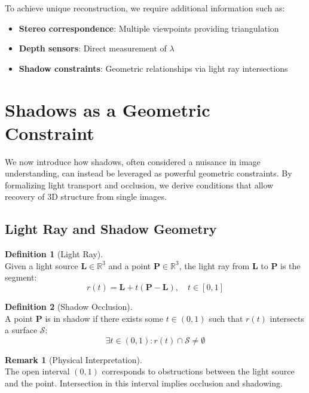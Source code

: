 \documentclass[12pt]{article}
\newcommand{\vect}[1]{\bm{#1}}
\theoremstyle{definition}
\newtheorem{definition}{Definition}[section]
\newtheorem{remark}{Remark}[section]
\begin{document}
To achieve unique reconstruction, we require additional information such as:
\begin{itemize}
    \item \textbf{Stereo correspondence}: Multiple viewpoints providing triangulation
    \item \textbf{Depth sensors}: Direct measurement of $\lambda$
    \item \textbf{Shadow constraints}: Geometric relationships via light ray intersections
\end{itemize}

\section{Shadows as a Geometric Constraint}

We now introduce how shadows, often considered a nuisance in image understanding, can instead be leveraged as powerful geometric constraints. By formalizing light transport and occlusion, we derive conditions that allow recovery of 3D structure from single images.

\subsection{Light Ray and Shadow Geometry}

\begin{definition}[Light Ray] ~\\
Given a light source $\vect{L} \in \mathbb{R}^3$ and a point $\vect{P} \in \mathbb{R}^3$, the light ray from $\vect{L}$ to $\vect{P}$ is the segment:
\begin{equation}
\boxed{r(t) = \vect{L} + t(\vect{P} - \vect{L}), \quad t \in [0,1]} \label{eq:light_ray}
\end{equation}
\end{definition}

\begin{definition}[Shadow Occlusion] ~\\
A point $\vect{P}$ is in shadow if there exists some $t \in (0,1)$ such that $r(t)$ intersects a surface $\mathcal{S}$:
\begin{equation}
\boxed{\exists t \in (0,1): r(t) \cap \mathcal{S} \neq \emptyset}
\end{equation}
\end{definition}

\begin{remark}[Physical Interpretation] ~\\
The open interval $(0,1)$ corresponds to obstructions between the light source and the point. Intersection in this interval implies occlusion and shadowing.
\end{remark}
\end{document}
